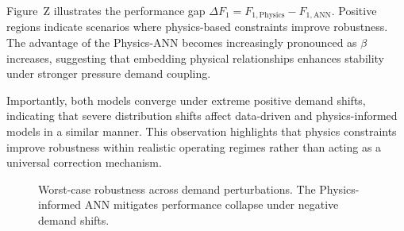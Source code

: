 \documentclass[final,5p,times,twocolumn,authoryear]{elsarticle}
\begin{document}
Figure~Z illustrates the performance gap $\Delta F_1 = F_{1,\text{Physics}} - F_{1,\text{ANN}}$. Positive regions indicate scenarios where physics-based constraints improve robustness. The advantage of the Physics-ANN becomes increasingly pronounced as $\beta$ increases, suggesting that embedding physical relationships enhances stability under stronger pressure demand coupling.

Importantly, both models converge under extreme positive demand shifts, indicating that severe distribution shifts affect data-driven and physics-informed models in a similar manner. This observation highlights that physics constraints improve robustness within realistic operating regimes rather than acting as a universal correction mechanism.

\begin{figure}[H]
\centering
{}
\caption{Worst-case robustness across demand perturbations. The Physics-informed ANN mitigates performance collapse under negative demand shifts.}
\end{figure}
\end{document}

